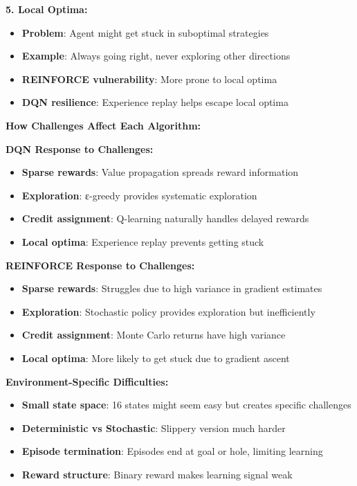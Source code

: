 \documentclass[12pt]{article}
\begin{document}
{{{\textbf{5. Local Optima:}
\begin{itemize}
    \item \textbf{Problem}: Agent might get stuck in suboptimal strategies
    \item \textbf{Example}: Always going right, never exploring other directions
    \item \textbf{REINFORCE vulnerability}: More prone to local optima
    \item \textbf{DQN resilience}: Experience replay helps escape local optima
\end{itemize}

\textbf{How Challenges Affect Each Algorithm:}

\textbf{DQN Response to Challenges:}
\begin{itemize}
    \item \textbf{Sparse rewards}: Value propagation spreads reward information
    \item \textbf{Exploration}: ε-greedy provides systematic exploration
    \item \textbf{Credit assignment}: Q-learning naturally handles delayed rewards
    \item \textbf{Local optima}: Experience replay prevents getting stuck
\end{itemize}

\textbf{REINFORCE Response to Challenges:}
\begin{itemize}
    \item \textbf{Sparse rewards}: Struggles due to high variance in gradient estimates
    \item \textbf{Exploration}: Stochastic policy provides exploration but inefficiently
    \item \textbf{Credit assignment}: Monte Carlo returns have high variance
    \item \textbf{Local optima}: More likely to get stuck due to gradient ascent
\end{itemize}

\textbf{Environment-Specific Difficulties:}
\begin{itemize}
    \item \textbf{Small state space}: 16 states might seem easy but creates specific challenges
    \item \textbf{Deterministic vs Stochastic}: Slippery version much harder
    \item \textbf{Episode termination}: Episodes end at goal or hole, limiting learning
    \item \textbf{Reward structure}: Binary reward makes learning signal weak
\end{itemize}

}}}
\end{document}
